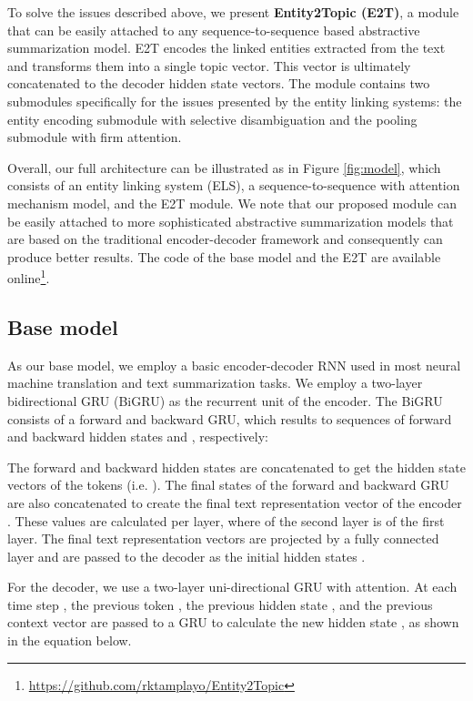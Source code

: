 \documentclass[11pt,a4paper]{article}
\begin{document}
To solve the issues described above, we present \textbf{Entity2Topic (E2T)}, a module that can be easily attached to any sequence-to-sequence based abstractive summarization model. E2T encodes the linked entities extracted from the text and transforms them into a single topic vector. This vector is ultimately concatenated to the decoder hidden state vectors. The module contains two submodules specifically for the issues presented by the entity linking systems: the entity encoding submodule with selective disambiguation and the pooling submodule with firm attention.

Overall, our full architecture can be illustrated as in Figure \ref{fig:model}, which consists of an entity linking system (ELS), a sequence-to-sequence with attention mechanism model, and the E2T module.
We note that our proposed module can be easily attached to more sophisticated abstractive summarization models \cite{zhou2017selective,tan2017abstractive} that are based on the traditional encoder-decoder framework and consequently can produce better results.
The code of the base model and the E2T are available online\footnote{\url{https://github.com/rktamplayo/Entity2Topic}}.

\subsection{Base model}

As our base model, we employ a basic encoder-decoder RNN used in most neural machine translation \cite{bahdanau2014neural} and text summarization \cite{nallapati2016abstractive} tasks. We employ a two-layer bidirectional GRU (BiGRU) as the recurrent unit of the encoder.
The BiGRU consists of a forward and backward GRU, which results to sequences of forward and backward hidden states  and , respectively:


The forward and backward hidden states are concatenated to get the hidden state vectors of the tokens (i.e. ). The final states of the forward and backward GRU are also concatenated to create the final text representation vector of the encoder . These values are calculated per layer, where  of the second layer is  of the first layer. The final text representation vectors are projected by a fully connected layer and are passed to the decoder as the initial hidden states .

For the decoder, we use a two-layer uni-directional GRU with attention. At each time step , the previous token , the previous hidden state , and the previous context vector  are passed to a GRU to calculate the new hidden state , as shown in the equation below.
\end{document}
